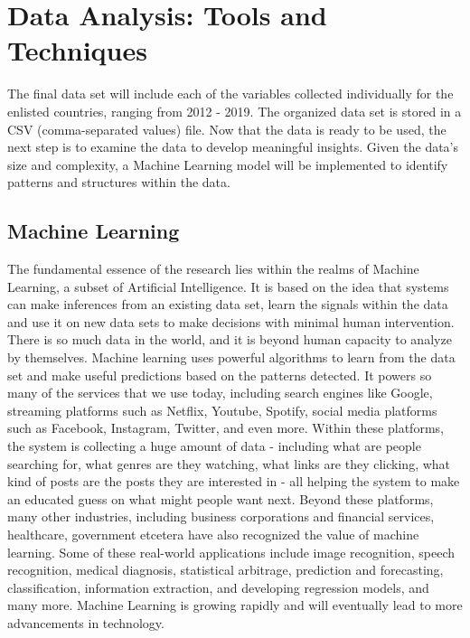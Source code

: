 \section{Data Analysis: Tools and Techniques}

The final data set will include each of the variables collected individually for the enlisted countries, ranging from 2012 - 2019. The organized data set is stored in a CSV (comma-separated values) file. Now that the data is ready to be used, the next step is to examine the data to develop meaningful insights. Given the data’s size and complexity, a Machine Learning model will be implemented to identify patterns and structures within the data.

\subsection{Machine Learning}

\hspace{20pt}The fundamental essence of the research lies within the realms of Machine Learning, a subset of Artificial Intelligence. It is based on the idea that systems can make inferences from an existing data set, learn the signals within the data and use it on new data sets to make decisions with minimal human intervention. There is so much data in the world, and it is beyond human capacity to analyze by themselves. Machine learning uses powerful algorithms to learn from the data set and make useful predictions based on the patterns detected. It powers so many of the services that we use today, including search engines like Google, streaming platforms such as Netflix, Youtube, Spotify, social media platforms such as Facebook, Instagram, Twitter, and even more. Within these platforms, the system is collecting a huge amount of data - including what are people searching for, what genres are they watching, what links are they clicking, what kind of posts are the posts they are interested in - all helping the system to make an educated guess on what might people want next. Beyond these platforms, many other industries, including business corporations and financial services, healthcare, government etcetera have also recognized the value of machine learning. Some of these real-world applications include image recognition, speech recognition, medical diagnosis, statistical arbitrage, prediction and forecasting, classification, information extraction, and developing regression models, and many more. Machine Learning is growing rapidly and will eventually lead to more advancements in technology.

